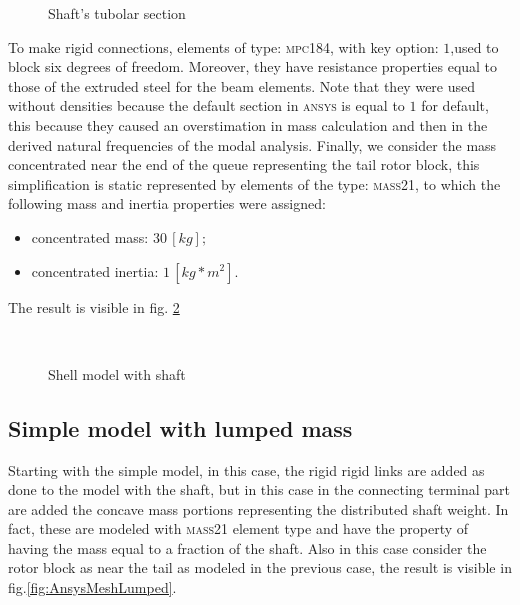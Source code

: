 \begin{figure}[!htb]
\centering
\resizebox{.25\linewidth}{!}{}
\caption{Shaft's tubolar section}
\label{fig:SectCTube}
\end{figure}
\noindent To make rigid connections, elements of type: \textsc{mpc184}, with key option: $1$,used to block six degrees of freedom. Moreover, they have resistance properties equal to those of the extruded steel for the beam elements. 
Note that they were used without densities because the default section in \textsc{ansys} is equal to $1$ for default, this because they caused an overstimation in mass calculation and then in the derived natural frequencies of the modal analysis.
Finally, we consider the mass concentrated near the end of the queue representing the tail rotor block, this simplification is static represented by elements of the type: \textsc{mass21}, to which the following mass and inertia properties were assigned:
\begin{itemize}
\item concentrated mass: $30\,[kg];$
\item concentrated inertia:  $1\,[kg*m^2]$. 
\end{itemize}
The result is visible in fig. \ref{fig:Ansys1MeshShaft}

\begin{figure}[htb]
\centering
{} \quad
{}\\
\caption{Shell model with shaft}
\label{fig:Ansys1MeshShaft}
\end{figure}

\subsection{Simple model with lumped mass}
Starting with the simple model, in this case, the rigid rigid links are added as done to the model with the shaft, but in this case in the connecting terminal part are added the concave mass portions representing the distributed shaft weight. In fact, these are modeled with \textsc{mass21} element type and have the property of having the mass equal to a fraction of the shaft.
Also in this case consider the rotor block as near the tail as modeled in the previous case, the result is visible in fig.\ref{fig:AnsysMeshLumped}.

